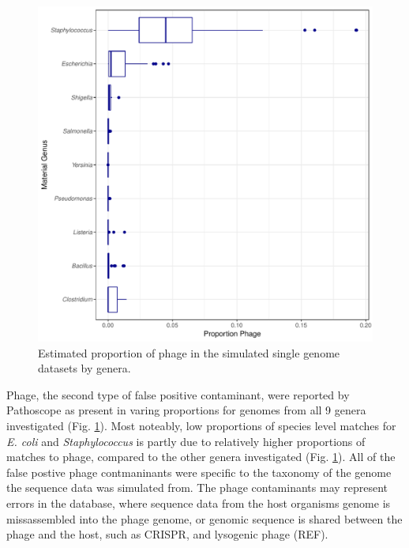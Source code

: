\documentclass[fleqn,10pt,lineno]{wlpeerj}\usepackage[]{graphicx}\usepackage[]{color}
\makeatletter
\def\maxwidth{ %
  \ifdim\Gin@nat@width>\linewidth
    \linewidth
  \else
    \Gin@nat@width
  \fi
}
\newenvironment{knitrout}{}{} %
\makeatother
\begin{document}
\begin{knitrout}
\color{fgcolor}\begin{figure}
\includegraphics[width=\maxwidth]{figure/phage_prop-1.pdf} \caption[Estimated proportion of phage in the simulated single genome datasets by genera]{Estimated proportion of phage in the simulated single genome datasets by genera.}\label{fig:phage_prop}
\end{figure}


\end{knitrout}

Phage, the second type of false positive contaminant, were reported by Pathoscope as present in varing proportions for genomes from all 9 genera investigated (Fig. \ref{fig:phage_prop}). 
Most noteably, low proportions of species level matches for \textit{E. coli} and \textit{Staphylococcus} is partly due to relatively higher proportions of matches to phage, compared to the other genera investigated (Fig. \ref{fig:phage_prop}). 
All of the false postive phage contmaninants were specific to the taxonomy of the genome the sequence data was simulated from. 
The phage contaminants may represent errors in the database, where sequence data from the host organisms genome is missassembled into the phage genome, or genomic sequence is shared between the phage and the host, such as CRISPR, and lysogenic phage (REF).  
\end{document}
